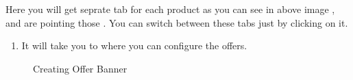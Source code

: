 \documentclass[a4paper,10pt,english]{report}
\begin{document}
\begin{figure}[htbp]
\centering

\noindent{}
\end{figure}

Here you will get seprate tab for each product as you can see in above image ,  and  are pointing those . You can switch between these tabs just by clicking on it.
\begin{enumerate}
\def\theenumi{\arabic{enumi}}
\def\labelenumi{\theenumi .}
\makeatletter\def\p@enumii{\p@enumi \theenumi .}\makeatother
\setcounter{enumi}{3}
\item {} 
It will take you to  where you can configure the offers.

\end{enumerate}

\begin{figure}[htbp]
\centering
\capstart

\noindent{}
\caption{Creating Offer Banner}\label{\detokenize{configure:id12}}\label{\detokenize{configure:id4}}\end{figure}
\end{document}
